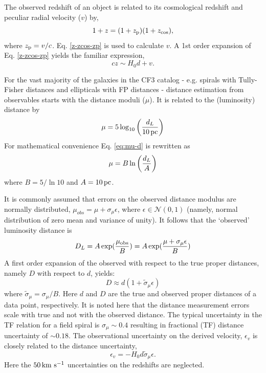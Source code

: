 \documentclass[useAMS,usenatbib]{mn2e}
\newcommand{\kms}{{\,\rm km \ s^{-1}}}
\def\zcos{ z_{\rm cos} }
\def\zp{ z_{\rm p} }
\begin{document}
The observed redshift of an object is related to its cosmological redshift and peculiar radial velocity ($v$)  by,
\begin{equation}
 1+z = (1+\zp)(1+\zcos),
\label{z-zcos-zp}
\end{equation}
where $z_{\rm p}=v/c$. 
Eq. \ref{z-zcos-zp} is used to calculate $v$. A 1st order expansion of Eq. \ref{z-zcos-zp} yields the familiar expression,
\begin{equation}
cz\sim H_0 d +v.
\label{cz-H0d-v}
\end{equation}



For the vast majority of the galaxies in the CF3 catalog - e.g. spirals with Tully-Fisher distances  and ellipticals with FP distances -  distance  estimation from observables starts with the   distance moduli ($\mu$).  It is related to the (luminosity) distance by
\begin{equation}
\mu = 5 \log_{10}\left({d_ L\over 10 {\,\rm pc}}\right)
\label{eq:mu-d}
\end{equation}
For mathematical convenience Eq. \ref{eq:mu-d} is rewritten as 
\begin{equation}
\mu  = B \ln\left({d_L\over A}\right)
\label{eq:mu-d-ln}
\end{equation}
where $B=5/\ln{10}$ and $A=10 \,{\rm pc}$.


It is commonly assumed  that errors on the observed distance modulus are normally distributed, $\mu_{obs}=\mu +\sigma_\mu \epsilon$, where $\epsilon\in\mathcal{N}(0,1)$ (namely, normal distribution of zero mean and variance of unity). It follows that the `observed' luminosity distance is
\begin{equation}
D_L=A\exp({\mu_{\rm obs}\over B})=A\exp({\mu +\sigma_\mu \epsilon\over B})
\label{eq:dobs}
\end{equation}
A first order expansion   of the  observed with respect to the true proper distances, namely $D$ with respect to $d$, yields:
\begin{equation}
D \approx d (1 + \tilde{\sigma}_\mu \epsilon)
\label{eq:d-1st-order}
\end{equation}
where %
$\tilde{\sigma}_\mu=\sigma_\mu/B$.
Here $d$ and $D$ are the true and observed proper distances of a data point, respectively.
It is noted here that the distance measurement errors scale with true    and not with the observed distance.
The typical uncertainty in the TF relation for a field spiral is $\sigma_\mu\sim 0.4$ resulting in fractional (TF) distance uncertainty of $\sim 0.18$.
The observational uncertainty on the derived velocity, $\epsilon_v$ is closely related to the distance uncertainty,
\begin{equation}
\epsilon_v=-H_0 d \tilde{\sigma}_\mu \epsilon.
\label{eq:eps-v}
\end{equation}
Here  the $50\kms$ uncertainties on the redshifts are neglected.
\end{document}
